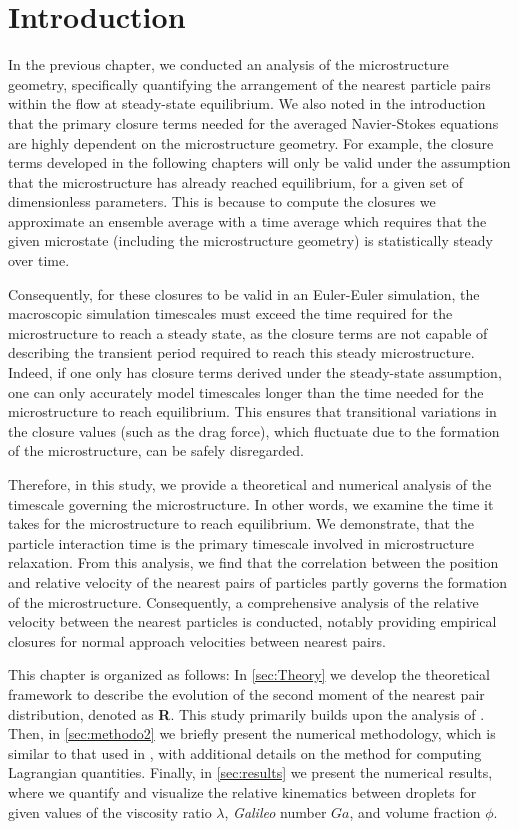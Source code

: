 \section{Introduction}

In the previous chapter, we conducted an analysis of the microstructure geometry, specifically quantifying the arrangement of the nearest particle pairs within the flow at steady-state equilibrium. 
We also noted in the introduction that the primary closure terms needed for the averaged Navier-Stokes equations are highly dependent on the microstructure geometry. 
For example, the closure terms developed in the following chapters will only be valid under the assumption that the microstructure has already reached equilibrium, for a given set of dimensionless parameters.
This is because to compute the closures we approximate an ensemble average with a time average which requires that the given microstate (including the microstructure geometry) is statistically steady over time. 

Consequently, for these closures to be valid in an Euler-Euler simulation, the macroscopic simulation timescales must exceed the time required for the microstructure to reach a steady state, as the closure terms are not capable of describing the transient period required to reach this steady microstructure. 
Indeed, if one only has closure terms derived under the steady-state assumption, one can only accurately model timescales longer than the time needed for the microstructure to reach equilibrium. 
This ensures that transitional variations in the closure values (such as the drag force), which fluctuate due to the formation of the microstructure, can be safely disregarded.


Therefore, in this study, we provide a theoretical and numerical analysis of the timescale governing the microstructure. 
In other words, we examine the time it takes for the microstructure to reach equilibrium. 
We demonstrate, that the particle interaction time is the primary timescale involved in microstructure relaxation. 
From this analysis, we find that the correlation between the position and relative velocity of the nearest pairs of particles partly governs the formation of the microstructure. 
Consequently, a comprehensive analysis of the relative velocity between the nearest particles is conducted, notably providing empirical closures for normal approach velocities between nearest pairs. 

This chapter is organized as follows: 
In \ref{sec:Theory} we develop the theoretical framework to describe the evolution of the second moment of the nearest pair distribution, denoted as \textbf{R}.
This study primarily builds upon the analysis of \citet{zhang2023evolution}. 
Then, in \ref{sec:methodo2} we briefly present the numerical methodology, which is similar to that used in \citet{fintzi2024buoyancy}, with additional details on the method for computing Lagrangian quantities. 
Finally, in \ref{sec:results} we present the numerical results, where we quantify and visualize the relative kinematics   between droplets for given values of the viscosity ratio $\lambda$, \textit{Galileo} number $Ga$, and volume fraction $\phi$.

